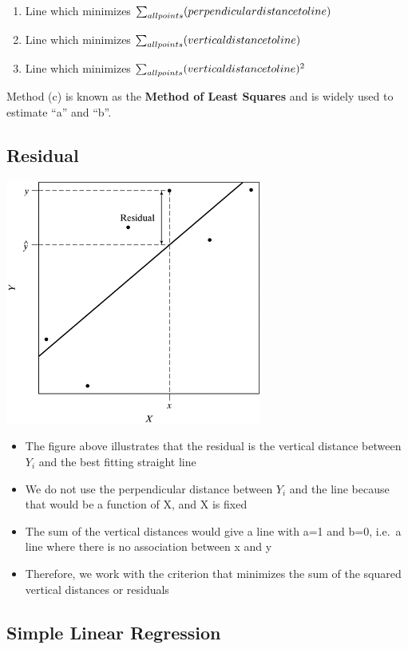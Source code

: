 \documentclass[
]{book}
\providecommand{\tightlist}{%
  \setlength{\itemsep}{0pt}\setlength{\parskip}{0pt}}
\begin{document}
\begin{enumerate}
\def\labelenumi{(\alph{enumi})}
\item
  Line which minimizes \(\sum_{all\space points}(perpendicular\space distance\space to\space line)\)
\item
  Line which minimizes \(\sum_{all\space points}(vertical\space distance\space to\space line)\)
\item
  Line which minimizes \(\sum_{all\space points}(vertical\space distance\space to\space line)^2\)
\end{enumerate}

Method (c) is known as the \textbf{Method of Least Squares} and is widely used to estimate ``a'' and ``b''.

\hypertarget{residual}{%
\subsection{Residual}\label{residual}}

\includegraphics[width=0.5\linewidth]{./12_25}

\begin{itemize}
\tightlist
\item
  The figure above illustrates that the residual is the vertical distance between \(Y_i\) and the best fitting straight line
\item
  We do not use the perpendicular distance between \(Y_i\) and the line because that would be a function of X, and X is fixed
\item
  The sum of the vertical distances would give a line with a=1 and b=0, i.e.~a line where there is no association between x and y
\item
  Therefore, we work with the criterion that minimizes the sum of the squared vertical distances or residuals
\end{itemize}

\hypertarget{simple-linear-regression-2}{%
\subsection{Simple Linear Regression}\label{simple-linear-regression-2}}
\end{document}
